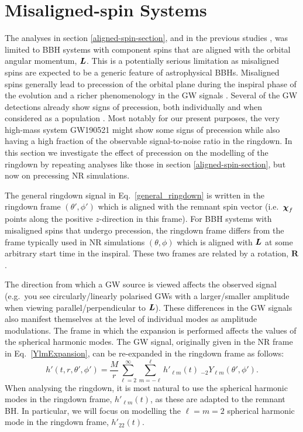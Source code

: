 \section{Misaligned-spin Systems}\label{misaligned-spin-section}

The analyses in section \ref{aligned-spin-section}, and in the previous studies \cite{1998PhRvD..57.4535F, 2007PhRvD..76f4034B, 2012PhRvD..85b4018K, 2014PhRvD..90l4032L, 2018PhRvD..98j4020C, 2018PhRvD..97j4065B, overtones, 2020PhRvD.101j4005O, mirror_modes}, was limited to BBH systems with component spins that are aligned with the orbital angular momentum, $\vb*{L}$.
This is a potentially serious limitation as misaligned spins are expected to be a generic feature of astrophysical BBHs.
Misaligned spins generally lead to precession of the orbital plane during the inspiral phase of the evolution and a richer phenomenology in the GW signals \cite{1994PhRvD..49.6274A}.
Several of the GW detections already show signs of precession, both individually \cite{2020arXiv201014527A, 2020arXiv201111948G} and when considered as a population \cite{2020arXiv201014533T}.
Most notably for our present purposes, the very high-mass system GW190521 \cite{2020PhRvL.125j1102A, 2020ApJ...900L..13A} might show some signs of precession while also having a high fraction of the observable signal-to-noise ratio in the ringdown. 
In this section we investigate the effect of precession on the modelling of the ringdown by repeating analyses like those in section \ref{aligned-spin-section}, but now on precessing NR simulations.

The general ringdown signal in Eq.~\ref{general_ringdown} is written in the ringdown frame $(\theta', \phi')$ which is aligned with the remnant spin vector (i.e.\ $\vb*{\chi}_f$ points along the positive $z$-direction in this frame). For BBH systems with misaligned spins that undergo precession, the ringdown frame differs from the frame typically used in NR simulations $(\theta, \phi)$ which is aligned with $\vb*{L}$ at some arbitrary start time in the inspiral.
These two frames are related by a rotation, $\mathbf{R}$.

The direction from which a GW source is viewed affects the observed signal 
(e.g.\ you see circularly/linearly polarised GWs with a larger/smaller amplitude when viewing parallel/perpendicular to $\vb*{L}$).
These differences in the GW signals also manifest themselves at the level of individual modes as amplitude modulations. The frame in which the expansion is performed affects the values of the spherical harmonic modes. 
The GW signal, originally given in the NR frame in Eq.~\ref{YlmExpansion}, can be re-expanded in the ringdown frame as follows:
\begin{equation}\label{hprimedecomp}
    h'(t, r, \theta', \phi') = \frac{M}{r} \sum_{\ell = 2}^{\infty} \sum_{m = -\ell}^{\ell}  h'_{\ell m}(t) ~ {}_{-2}Y_{\ell m}(\theta', \phi').
\end{equation}
When analysing the ringdown, it is most natural to use the spherical harmonic modes in the ringdown frame, $h'_{\ell m}(t)$, as these are adapted to the remnant BH. 
In particular, we will focus on modelling the $\ell = m = 2$ spherical harmonic mode in the ringdown frame, $h'_{22}(t)$.

